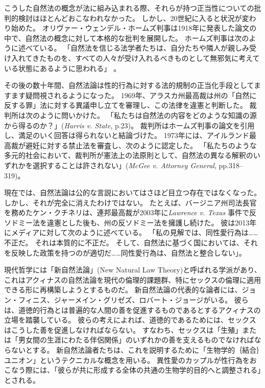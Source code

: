 \documentclass[paper=a4,book,openany]{jlreq}
\newcommand{\ig}[1]{}           %
\begin{document}
こうした自然法の概念が法に組み込まれる際、それらが持つ正当性についての批判的検討はほとんどおこなわれなかった。
しかし、20世紀に入ると状況が変わり始めた。
オリヴァー・ウェンデル・ホームズ判事は1918年に発表した論文の中で、自然法の概念に対して本格的な批判を展開した。
ホームズ判事は次のように述べている。
「自然法を信じる法学者たちは、自分たちや隣人が親しみ受け入れてきたものを、すべての人々が受け入れるべきものとして無邪気に考えている状態にあるように思われる」\citep[p.40]{holmes18:_natur_law} 。

その後の数十年間、自然法論は性的行為に対する法的規制の正当化手段としてますます疑問視されるようになった。
1969年、アラスカ州最高裁は州の「自然に反する罪」法に対する異議申し立てを審理し、この法律を違憲と判断した。
裁判所は次のように問いかけた。
「私たちは自然法の内容をどのような知識の源から得るのか？」(\emph{Harris v. State},  p.23)。
裁判所はホームズ判事の論文を引用し、満足のいく回答は得られないと結論づけた。
1973年には、アイルランド最高裁が避妊に対する禁止法を審査し、次のように認定した。
「私たちのような多元的社会において、裁判所が憲法上の法原則として、自然法の異なる解釈のいずれかを選択することは許されない」(\emph{McGee v. Attorney General}, pp.318--319)。

現在では、自然法論は公的な言説においてはさほど目立つ存在ではなくなった。
しかし、それが完全に消えたわけではない。
たとえば、バージニア州司法長官を務めたケン・クチネリは、連邦最高裁が2003年に\emph{Lawrence v. Texas} 事件で反ソドミー法を違憲とした後も、州の反ソドミー法を擁護し続けた。
彼は2013年にメディアに対して次のように述べている。
「私の見解では、同性愛行為は……不正だ。
それは本質的に不正だ。
そして、自然法に基づく国においては、それを反映した政策を持つのが適切だ……同性愛行為は、自然法と整合しない」\citep{bump13:_virgin_is_retro}。

現代哲学には「新自然法論」(New Natural Law Theory)と呼ばれる学派があり、これはアクィナスの自然法論を現代の倫理的課題群、特にセックスの倫理に適用できる形に再構築しようとするものだ。
新自然法論の代表的な論者には、ジョン・フィニス、ジャーメイン・グリゼズ、ロバート・ジョージがいる。
彼らは、道徳的行為とは普遍的な人間の善を促進するものであるとするアクィナスの立場を踏襲している。
彼らの考えによれば、道徳的であるためには、セックスはこうした善を促進しなければならない。
すなわち、セックスは「生殖」または「男女間の生涯にわたる伴侶関係」のいずれかの善を支えるものでなければならないとする。
新自然法論者たちは、これを説明するために「生物学的｛結合｝{ユニオン}」というテクニカルな概念を用いる。
異性愛のカップルが性行為をおこなう際には、「彼らが共に形成する全体の共通の生物学的目的へと調整される」とされる\citep[p.25]{girgis12:_what_marriag}。
\ig{Ryan T. Anderson}
\end{document}
